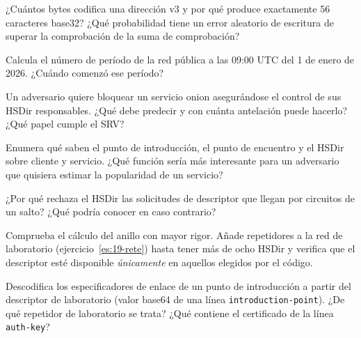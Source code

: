 \begin{esercizio}[1]\label{es:14-indirizzo}
¿Cuántos bytes codifica una dirección v3 y por qué produce exactamente 56 caracteres base32? ¿Qué probabilidad tiene un error aleatorio de escritura de superar la comprobación de la suma de comprobación?
\end{esercizio}

\begin{esercizio}[1]\label{es:14-periodo}
Calcula el número de período de la red pública a las 09:00 UTC del 1 de enero de 2026. ¿Cuándo comenzó ese período?
\end{esercizio}

\begin{esercizio}[2]\label{es:14-hsdir}
Un adversario quiere bloquear un servicio onion asegurándose el control de sus HSDir responsables. ¿Qué debe predecir y con cuánta antelación puede hacerlo? ¿Qué papel cumple el SRV?
\end{esercizio}

\begin{esercizio}[2]\label{es:14-ruoli}
Enumera qué saben el punto de introducción, el punto de encuentro y el HSDir sobre cliente y servicio. ¿Qué función sería más interesante para un adversario que quisiera estimar la popularidad de un servicio?
\end{esercizio}

\begin{esercizio}[2]\label{es:14-anonimo}
¿Por qué rechaza el HSDir las solicitudes de descriptor que llegan por circuitos de un salto? ¿Qué podría conocer en caso contrario?
\end{esercizio}

\begin{esercizio}[3]\label{es:14-anello}
Comprueba el cálculo del anillo con mayor rigor. Añade repetidores a la red de laboratorio (ejercicio~\ref{es:19-rete}) hasta tener más de ocho HSDir y verifica que el descriptor esté disponible \emph{únicamente} en aquellos elegidos por el código.
\end{esercizio}

\begin{esercizio}[3]\label{es:14-ipt}
Descodifica los especificadores de enlace de un punto de introducción a partir del descriptor de laboratorio (valor base64 de una línea \texttt{introduction-point}). ¿De qué repetidor de laboratorio se trata? ¿Qué contiene el certificado de la línea \texttt{auth-key}?
\end{esercizio}

